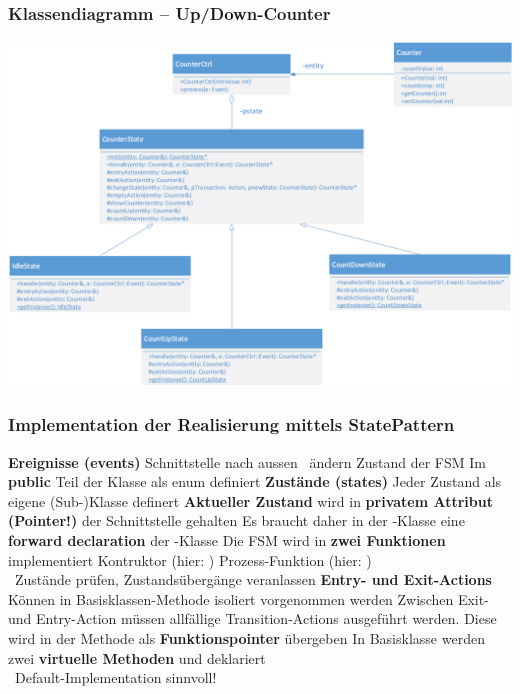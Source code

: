 \subsubsection{Klassendiagramm -- Up/Down-Counter}
\label{Klassendiagramm -- Up/Down-Counter - StatePattern}

\begin{center}
    \includegraphics[width=0.95\columnwidth]{images/fsm_up-down-counter_klassendiagramm_state_pattern.png}
\end{center}


\subsubsection{Implementation der Realisierung mittels StatePattern}

\begin{outline}
    \1 \textbf{Ereignisse (events)}
        \2 Schnittstelle nach aussen \textrightarrow\ ändern Zustand der FSM
        \2 Im \textbf{public} Teil der Klasse als enum definiert
    \1 \textbf{Zustände (states)}
        \2 Jeder Zustand als eigene (Sub-)Klasse definert
    \1 \textbf{Aktueller Zustand}  wird in \textbf{privatem Attribut (Pointer!)} der Schnittstelle gehalten
        \2 Es braucht daher in der -Klasse eine \textbf{forward declaration} der -Klasse
    \1 Die FSM wird in \textbf{zwei Funktionen} implementiert
        \2 Kontruktor (hier: )
        \2 Prozess-Funktion (hier: ) \\
            \textrightarrow\ Zustände prüfen, Zustandsübergänge veranlassen
    \1 \textbf{Entry- und Exit-Actions}
        \2 Können in Basisklassen-Methode  isoliert vorgenommen werden
        \2 Zwischen Exit- und Entry-Action müssen allfällige Transition-Actions ausgeführt werden. Diese wird in der Methode 
             als \textbf{Funktionspointer} übergeben
        \2 In Basisklasse werden zwei \textbf{virtuelle Methoden}  und  deklariert \\
            \textrightarrow\ Default-Implementation sinnvoll!
\end{outline}


